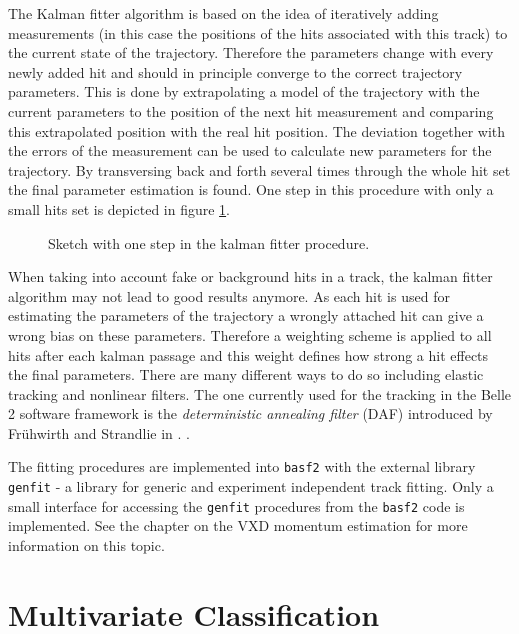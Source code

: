 The Kalman fitter algorithm \cite{kalman} is based on the idea of iteratively adding measurements (in this case the positions of the hits associated with this track) to the current state of the trajectory. Therefore the parameters change with every newly added hit and should in principle converge to the correct trajectory parameters. This is done by extrapolating a model of the trajectory with the current parameters to the position of the next hit measurement and comparing this extrapolated position with the real hit position. The deviation together with the errors of the measurement can be used to calculate new parameters for the trajectory. By transversing back and forth several times through the whole hit set the final parameter estimation is found. One step in this procedure with only a small hits set is depicted in figure \ref{fig-kalman}.

\begin{figure}
 \caption{Sketch with one step in the kalman fitter procedure.}
 \label{fig-kalman}
\end{figure}

When taking into account fake or background hits in a track, the kalman fitter algorithm may not lead to good results anymore. As each hit is used for estimating the parameters of the trajectory a wrongly attached hit can give a wrong bias on these parameters. Therefore a weighting scheme is applied to all hits after each kalman passage and this weight defines how strong a hit effects the final parameters. There are many different ways to do so including elastic tracking and nonlinear filters. The one currently used for the tracking in the Belle 2 software framework is the \emph{deterministic annealing filter} (DAF) introduced by Frühwirth and Strandlie in \cite{daf_fruh}. .

The fitting procedures are implemented into \texttt{basf2} with the external library \texttt{genfit} \cite{genfit} - a library for generic and experiment independent track fitting. Only a small interface for accessing the \texttt{genfit} procedures from the \texttt{basf2} code is implemented. See the chapter on the VXD momentum estimation for more information on this topic.

\section{Multivariate Classification}


